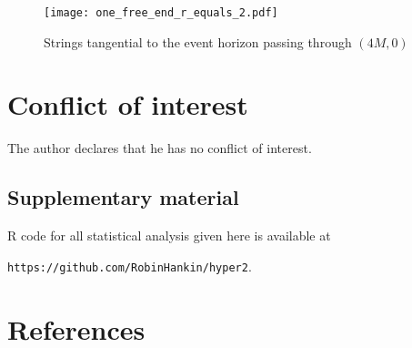\documentclass[review]{elsarticle}
\begin{document}
\begin{figure}[p] %
\centering
\texttt{[image: one\_free\_end\_r\_equals\_2.pdf]}
\caption{Strings tangential to the event horizon passing through $(4M,0)$}
\label{one_free_end_r_equals_2}
\end{figure}



 \section*{Conflict of interest}
 The author declares that he has no conflict of interest.

\subsection*{Supplementary material}

R code for all statistical analysis given here is available at

{\tt https://github.com/RobinHankin/hyper2}.

\section*{References}


\end{document}
